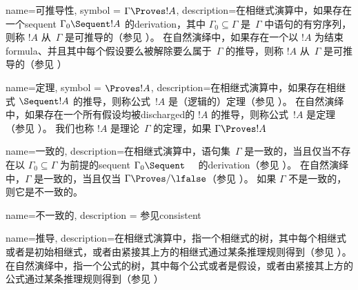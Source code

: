  {
  name=可推导性,
  symbol = {\ensuremath{\Gamma \Proves !A}},
  description={在相继式演算中，如果存在一个\gls{sequent} $\Gamma_0 \Sequent !A$ 的\gls{derivation}，其中 $\Gamma_0 \subseteq \Gamma$ 是~$\Gamma$ 中语句的有穷序列，则称 $!A$ 从~$\Gamma$ 是{可推导的}（参见
    ）。
在自然演绎中，如果存在一个以 $!A$ 为结束\gls{formula}、并且其中每个假设要么被{解除}要么属于~$\Gamma$ 的{推导}，则称 $!A$ 从~$\Gamma$ 是{可推导的}（参见
    ）} }

 {
  name={定理},
  symbol = {\ensuremath{\Proves !A}},
  description={在相继式演算中，如果存在相继式 $\Sequent !A$ 的{推导}，则称{公式}~$!A$ 是（逻辑的）{定理}（参见 ）。
在自然演绎中，如果存在一个所有假设均被\gls{discharged}的 $!A$ 的{推导}，则称{公式}~$!A$ 是{定理}（参见 ）。
我们也称 $!A$ 是理论~$\Gamma$ 的定理，如果 $\Gamma \Proves !A$} }

 {
  name=一致的,
  description={在相继式演算中，语句集~$\Gamma$ 是{一致的}，当且仅当不存在以 $\Gamma_0 \subseteq \Gamma$ 为前提的\gls{sequent} $\Gamma_0 \Sequent \quad$ 的\gls{derivation}（参见 ）。
在自然演绎中，$\Gamma$ 是{一致的}，当且仅当 $\Gamma \Proves/ \lfalse$（参见 ）。
如果 $\Gamma$ 不是一致的，则它是{不一致的}。} }

 {
  name=不一致的,
  description = {参见\gls{consistent}}}

 {
  name=推导,
  description={在相继式演算中，指一个相继式的树，其中每个相继式或者是初始相继式，或者由紧接其上方的相继式通过某条推理规则得到（参见 ）。
在自然演绎中，指一个公式的树，其中每个公式或者是假设，或者由紧接其上方的公式通过某条推理规则得到（参见 ）} }



